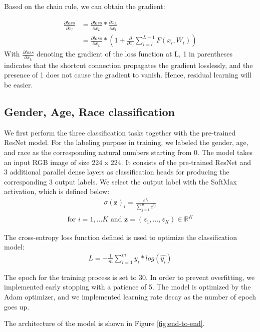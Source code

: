 \documentclass[DIV=calc, paper=a4, fontsize=10pt, twocolumn]{article}
\begin{document}
	
Based on the chain rule, we can obtain the gradient:
	
	$$
	\begin{aligned}
		\frac{\partial loss}{\partial x_l} & = \frac{\partial loss}{\partial x_L}*\frac{\partial x_L}{\partial x_l} \\
		& = \frac{\partial loss}{\partial x_L}*(1+\frac{\partial}{\partial x_l}\sum_{i=l}^{L-1}F(x_i, W_i))
	\end{aligned}
	$$
	With $\frac{\partial loss}{\partial x_L}$ denoting the gradient of the loss function at L, 1 in parentheses indicates that the shortcut connection propagates the gradient losslessly, and the presence of 1 does not cause the gradient to vanish. Hence, residual learning will be easier.
	
	
	\subsection{Gender, Age, Race classification}
	We first perform the three classification tasks together with the pre-trained ResNet model. For the labeling purpose in training, we labeled the gender, age, and race as the corresponding natural numbers starting from 0. The model takes an input RGB image of size 224 x 224. It consists of the pre-trained ResNet and 3 additional parallel dense layers as classification heads for producing the corresponding 3 output labels. We select the output label with the SoftMax activation, which is defined below:
	$$
	\begin{aligned}
		\sigma(\boldsymbol{z})_i = \frac{e^{z_i}}{\sum_{j=1}^{K}e^{z_j}}
	\end{aligned}
	$$
	$$
	\begin{aligned}
		\text{for } i=1,...K \text{ and } \boldsymbol{z}=(z_1,...,z_K)\in\mathbb{R}^K
	\end{aligned}
	$$
	
	
	The cross-entropy loss function defined is used to optimize the classification model:
	 $$
	 \begin{aligned}
	 	L=-\frac{1}{m}\sum_{i=1}^{m}y_i*log(\hat{y_i})
	 \end{aligned}
	 $$
	
	The epoch for the training process is set to 30. In order to prevent overfitting, we implemented early stopping with a patience of 5. The model is optimized by the Adam optimizer, and we implemented learning rate decay as the number of epoch goes up. 
	
	
	The architecture of the model is shown in Figure \ref{fig:end-to-end}.
\end{document}
